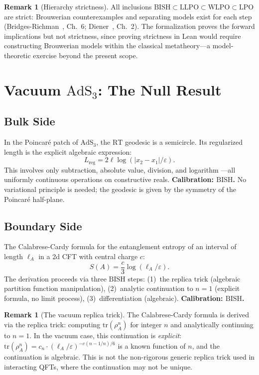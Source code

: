 \documentclass[11pt,a4paper]{article}
\theoremstyle{plain}
\theoremstyle{definition}
\newtheorem{remark}[theorem]{Remark}
\newcommand{\LPO}{\ensuremath{\mathrm{LPO}}}
\newcommand{\LLPO}{\ensuremath{\mathrm{LLPO}}}
\newcommand{\WLPO}{\ensuremath{\mathrm{WLPO}}}
\newcommand{\BISH}{\ensuremath{\mathrm{BISH}}}
\newcommand{\AdS}{\ensuremath{\mathrm{AdS}}}
\newcommand{\RT}{\ensuremath{\mathrm{RT}}}
\begin{document}
\begin{remark}[Hierarchy strictness]
All inclusions $\BISH \subset \LLPO \subset \WLPO \subset \LPO$
are strict: Brouwerian counterexamples and separating models exist
for each step (Bridges-Richman~\cite{BR1987}, Ch.~6;
Diener~\cite{Diener2018}, Ch.~2).  The formalization proves the
forward implications but not strictness, since proving strictness
in Lean would require constructing Brouwerian models within the
classical metatheory---a model-theoretic exercise beyond the
present scope.
\end{remark}

\section{Vacuum $\AdS_3$: The Null Result}\label{sec:vacuum}

\subsection{Bulk Side}

In the Poincar\'e patch of $\AdS_3$, the $\RT$ geodesic is a
semicircle.  Its regularized length is the explicit algebraic expression:
\[
  L_{\mathrm{reg}} = 2\ell \log(|x_2 - x_1|/\varepsilon).
\]
This involves only subtraction, absolute value, division, and logarithm
---all uniformly continuous operations on constructive reals.
\textbf{Calibration: $\BISH$.}  No variational principle is needed;
the geodesic is given by the symmetry of the Poincar\'e half-plane.

\subsection{Boundary Side}

The Calabrese-Cardy formula for the entanglement entropy of an
interval of length $\ell_A$ in a 2d CFT with central charge $c$:
\[
  S(A) = \frac{c}{3} \log(\ell_A / \varepsilon).
\]
The derivation proceeds via three $\BISH$ steps:
(1)~the replica trick (algebraic partition function manipulation),
(2)~analytic continuation to $n = 1$ (explicit formula, no limit process),
(3)~differentiation (algebraic).
\textbf{Calibration: $\BISH$.}

\begin{remark}[The vacuum replica trick]
The Calabrese-Cardy formula is derived via the replica trick:
computing $\text{tr}(\rho_A^n)$ for integer $n$ and analytically
continuing to $n = 1$.  In the vacuum case, this continuation is
\emph{explicit}: $\text{tr}(\rho_A^n) = c_n \cdot (\ell_A/\varepsilon)^{-c(n-1/n)/6}$
is a known function of $n$, and the continuation is algebraic.
This is not the non-rigorous generic replica trick used in
interacting QFTs, where the continuation may not be unique.
\end{remark}
\end{document}
